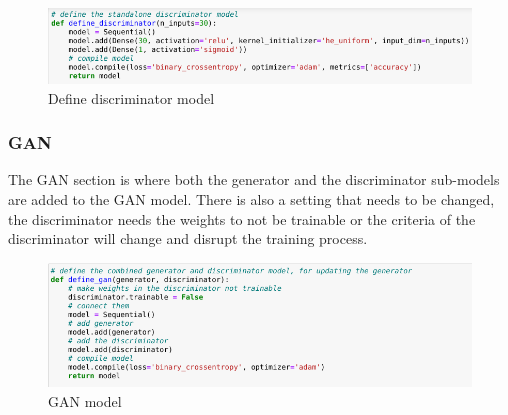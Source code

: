 \documentclass{report} %
\begin{document}
\begin{figure}[H]
\centering
\includegraphics[width=1.25\textwidth]{discriminator}
\caption{Define discriminator model\protect}
\label{board}
\end{figure}

\subsubsection{GAN}
The GAN section is where both the generator and the discriminator sub-models are added to the GAN model. There is also a setting that needs to be changed, the discriminator needs the weights to not be trainable or the criteria of the discriminator will change and disrupt the training process.

\begin{figure}[H]
\centering
\includegraphics[width=1.25\textwidth]{gan}
\caption{GAN model\protect}
\label{board}
\end{figure}
\end{document}
